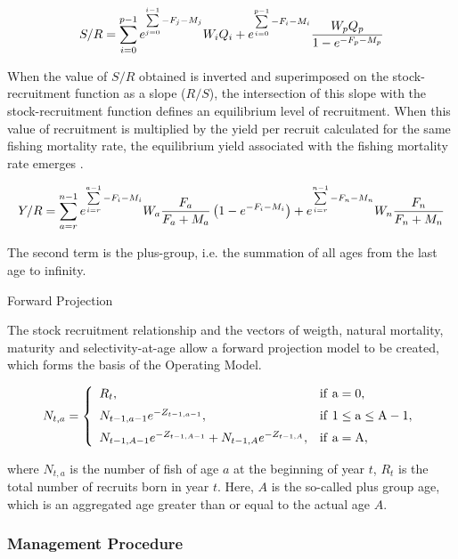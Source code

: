 \documentclass[preprint,review,12pt]{elsarticle}
\begin{document}
\begin{equation}
S/R=\sum\limits_{i=0}^{p-1} {e^{\sum\limits_{j=0}^{i-1} {-F_j-M_j}}} W_i Q_i + e^{\sum\limits_{i=0}^{p-1} {-F_i-M_i}} \frac{W_p Q_p}{1-e^{-F_p-M_p}}\\
\end{equation} 

When the value of $S/R$ obtained is inverted and superimposed on the stock-recruitment function as a slope ($R/S$), the intersection of this slope with the stock-recruitment function defines an equilibrium level of recruitment. When this value of recruitment is multiplied by the yield per recruit calculated for the same fishing mortality rate, the equilibrium yield associated with the fishing mortality rate emerges \cite{gabriel1999review}. 

\begin{equation}
Y/R=\sum\limits_{a=r}^{n-1} {e^{\sum\limits_{i=r}^{a-1} {-F_i-M_i}}} W_a\frac{F_a}{F_a+M_a}\left(1-e^{-F_i-M_i} \right) + e^{\sum\limits_{i=r}^{n-1} {-F_n-M_n}} W_n\frac{F_n}{F_n+M_n}\\
\end{equation} 

The second term is the plus-group, i.e. the summation of all ages from the last age to infinity. 

Forward Projection

The stock recruitment relationship and the vectors of weigth, natural mortality, maturity and selectivity-at-age allow a forward projection model to be created, which forms the basis of the Operating Model.

\begin{equation}
N_{t,a} =
\left\{
\begin{array}{ll}
\vspace{0.2cm}
R_t, & \rm{if} \ a=0,\\
\vspace{0.2cm}
N_{t-1,a-1} e^{-Z_{t-1,a-1}}, & \rm{if} \ 1 \leq a \leq A-1,\\
N_{t-1,A-1} e^{-Z_{t-1,A-1}}+N_{t-1,A} e^{-Z_{t-1,A}}, & \rm{if} \ a=A,
\end{array}
\right.
\end{equation}

where $N_{t,a}$ is the number of fish of age $a$ at the beginning of year $t$, $R_t$ is the total number of recruits born in year $t$. Here, $A$ is the so-called plus group age, which is an aggregated age greater than or equal to the actual age $A$.


\subsubsection{Management Procedure}
\end{document}
